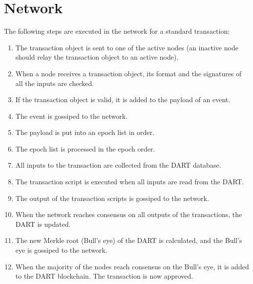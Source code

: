 \section{Network}\label{sec:network}
The following steps are executed in the network for a standard transaction:
\begin{enumerate}
 \item 
     The transaction object is sent to one of the active nodes (an inactive node should relay the transaction object to an active node).
 \item 
    When a node receives a transaction object, its format and the signatures of all the inputs are checked.
 \item 
    If the transaction object is valid, it is added to the payload of an event.
 \item 
    The event is gossiped to the network.
 \item 
    The payload is put into an epoch list in order.
 \item 
    The epoch list is processed in the epoch order.
 \item 
    All inputs to the transaction are collected from the DART database.
 \item 
    The transaction script is executed when all inputs are read from the DART.
 \item 
    The output of the transaction scripts is gossiped to the network.
 \item 
    When the network reaches consensus on all outputs of the transactions, the DART is updated. 
 \item 
    The new Merkle root (Bull’s eye) of the DART is calculated, and the Bull’s eye is gossiped to the network. 
 \item 
    When the majority of the nodes reach consensus on the Bull’s eye, it is added to the DART blockchain. The transaction is now approved.
\end{enumerate}
